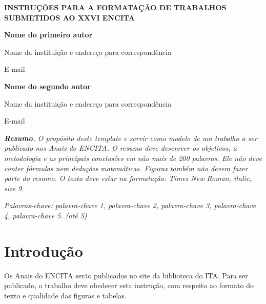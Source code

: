 \documentclass[brazilian, fleqn, 10pt]{article}
\renewcommand\sec[1]{%
    \medskip
    \section{#1}
    \medskip
}
\begin{document}
\thispagestyle{firstpage}

$ $

\begin{center}
    \Large \textbf{INSTRUÇÕES PARA A FORMATAÇÃO DE TRABALHOS SUBMETIDOS AO XXVI
    ENCITA}
\end{center}

\vspace{14pt}

\noindent \textbf{Nome do primeiro autor}

\noindent \small Nome da instituição e endereço para correspondência \normalsize


\noindent \small E-mail \normalsize

\medskip

\noindent \textbf{Nome do segundo autor}

\noindent \small Nome da instituição e endereço para correspondência \normalsize


\noindent \small E-mail \normalsize


\medskip
\noindent \small
\emph{%
    \textbf{Resumo.}
    O propósito deste template e servir como modelo de um trabalho a ser
    publicado nos Anais do ENCITA. O resumo deve descrever os objetivos, a
    metodologia e as principais conclusões em não mais de 200 palavras. Ele não
    deve conter fórmulas nem deduções matemáticas. Figuras também não devem
    fazer parte do resumo. O texto deve estar na formatação: Times New Roman,
    italic, size 9.
} \normalsize

\medskip
\noindent \small
\emph{%
    Palavras-chave: palavra-chave 1, palavra-chave 2, palavra-chave 3,
    palavra-chave 4, palavra-chave 5. (até 5)
} \normalsize

\sec{Introdução}


Os Anais do ENCITA serão publicados no site da biblioteca do ITA. Para ser
publicado, o trabalho deve obedecer esta instrução, com respeito ao formato do
texto e qualidade das figuras e tabelas.
\end{document}
